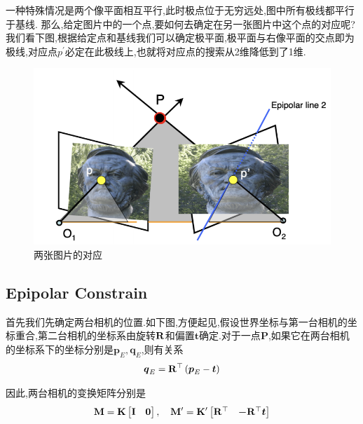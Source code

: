一种特殊情况是两个像平面相互平行,此时极点位于无穷远处,图中所有极线都平行于基线.
那么,给定图片中的一个点,要如何去确定在另一张图片中这个点的对应呢?我们看下图,根据给定点和基线我们可以确定极平面,极平面与右像平面的交点即为极线,对应点$p^\prime$必定在此极线上,也就将对应点的搜索从2维降低到了1维.
\begin{figure}[htbp]
	\centering
	\includegraphics[scale=0.45]{figures/epi-geo-2pic.png}
	\caption{两张图片的对应}
\end{figure}

\subsection{Epipolar Constrain}
首先我们先确定两台相机的位置.如下图,方便起见,假设世界坐标与第一台相机的坐标重合,第二台相机的坐标系由旋转$\bold{R}$和偏置$\bm t$确定.对于一点$\bm P$,如果它在两台相机的坐标系下的坐标分别是$\bm p_E, \bm q_E$,则有关系
\begin{equation}
	\boldsymbol q_E = \bold{R}^{\top}\left( \boldsymbol p_E - \boldsymbol t\right)
\end{equation}

因此,两台相机的变换矩阵分别是
\begin{equation}
	\bold{M} = \bold{K}
	\begin{bmatrix}
		\bold{I} & \boldsymbol 0
	\end{bmatrix} ,
	\quad
	\bold{M}^\prime = \bold{K}^\prime
	\begin{bmatrix}
		\bold{R}^{\top} & \boldsymbol -\bold{R}^{\top} \boldsymbol t
	\end{bmatrix}
\end{equation}


